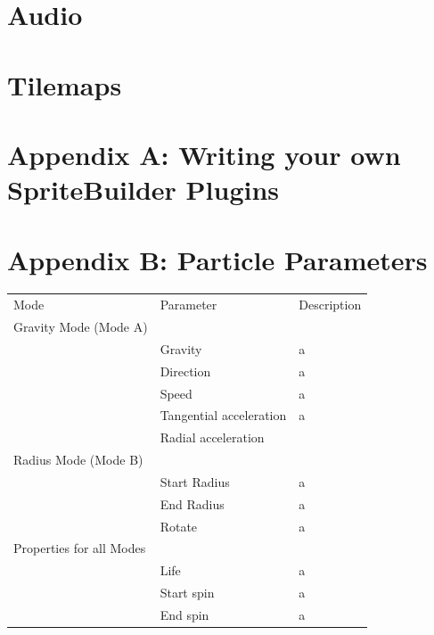 \documentclass{scrreprt}
\begin{document}
\chapter{Audio}

\chapter{Tilemaps}

\chapter{Appendix A: Writing your own SpriteBuilder Plugins}
\chapter{Appendix B: Particle Parameters}
\begin{table}
    \begin{tabular}{lll}
    Mode                     & Parameter               & Description \\
    Gravity Mode (Mode A)    & ~                       & ~           \\ \hline
    ~                        & Gravity                 & a           \\
    ~                        & Direction               & a           \\
    ~                        & Speed                   & a           \\
    ~                        & Tangential acceleration & a           \\
    ~                        & Radial acceleration     & ~           \\
    Radius Mode (Mode B)     & ~                       & ~           \\
    ~                        & Start Radius            & a           \\
    ~                        & End Radius              & a           \\
    ~                        & Rotate                  & a           \\
    Properties for all Modes & ~                       & ~           \\
    ~                        & Life                    & a           \\
    ~                        & Start spin              & a           \\
    ~                        & End spin                & a           \\

\end{tabular}
\end{table}
\end{document}

